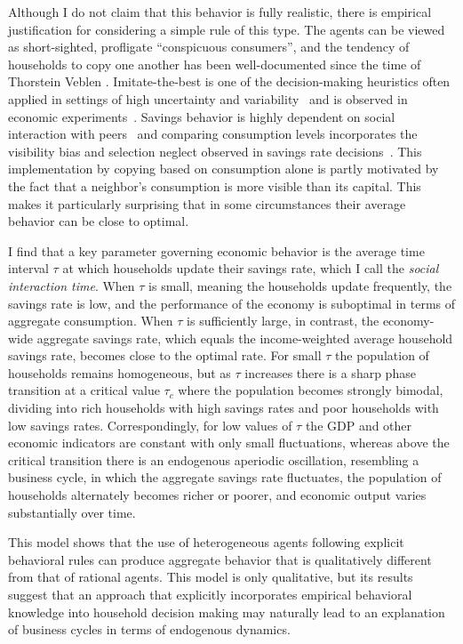 Although I do not claim that this behavior is fully realistic, there is empirical justification for considering a simple rule of this type.  The agents can be viewed as short-sighted, profligate ``conspicuous consumers'', and the tendency of households to copy one another has been well-documented since the time of Thorstein Veblen \cite{veblen1899}.  Imitate-the-best is one of the decision-making heuristics often applied in settings of high uncertainty and variability~\cite{Gigerenzer2011} and is observed in economic experiments~\cite{Traulsen2010}.  Savings behavior is highly dependent on social interaction with peers~\cite{Lu2011,Zhang2018,Kaustia2012, cascades} and comparing consumption levels incorporates the visibility bias and selection neglect observed in savings rate decisions~\cite{enke2015you}.  This implementation by copying based on consumption alone is partly motivated by the fact that a neighbor's consumption is more visible than its capital.    This makes it particularly surprising that in some circumstances their average behavior can be close to optimal.

I find that a key parameter governing economic behavior is the average time interval $\tau$ at which households update their savings rate, which I call the \textit{social interaction time}.  When $\tau$ is small, meaning the households update frequently, the savings rate is low, and the performance of the economy is suboptimal in terms of aggregate consumption. When $\tau$ is sufficiently large, in contrast, the economy-wide aggregate savings rate, which equals the income-weighted average household savings rate, becomes close to the optimal rate.  For small $\tau$ the population of households remains homogeneous, but as $\tau$ increases there is a sharp phase transition at a critical value $\tau_{c}$ where the population becomes strongly bimodal, dividing into rich households with high savings rates and poor households with low savings rates.  Correspondingly, for low values of $\tau$ the GDP and other economic indicators are constant with only small fluctuations, whereas above the critical transition there is an endogenous aperiodic oscillation, resembling a business cycle, in which the aggregate savings rate fluctuates, the population of households alternately becomes richer or poorer, and economic output varies substantially over time.  

This model shows that the use of heterogeneous agents following explicit behavioral rules can produce aggregate behavior that is qualitatively different from that of rational agents. This model is only qualitative, but its results suggest that an approach that explicitly incorporates empirical behavioral knowledge into household decision making may naturally lead to an explanation of business cycles in terms of endogenous dynamics. 

